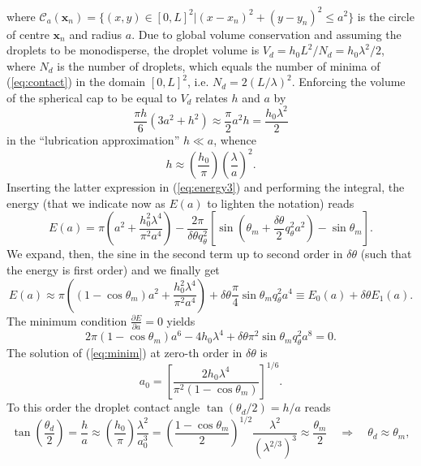 \documentclass[amsmath,amssymb,showpacs,prl,superscriptaddress,notitlepage]{revtex4-1}
\begin{document}
where
$\mathcal{C}_a(\mathbf{x}_n)=\{(x,y) \in [0, L]^2|(x-x_n)^2 + (y-y_n)^2 \leq a^2\}$
is the circle of centre $\mathbf{x}_n$ and radius $a$. 
Due to global volume conservation and assuming the droplets to be monodisperse, the droplet
volume is $V_d = h_0L^2/N_d = h_0 \lambda^2/2$,
where $N_d$ is the number of droplets, which equals the number of
minima of (\ref{eq:contact}) in the domain $[0, L]^2$, i.e. $N_d = 2(L/\lambda)^2$.
Enforcing the volume of the spherical cap to be equal to $V_d$ relates $h$ and $a$ by
\begin{equation}
\frac{\pi h}{6}(3a^2 + h^2) \approx \frac{\pi}{2} a^2 h =  \frac{h_0 \lambda^2}{2}    
\end{equation}
in the ``lubrication approximation'' $h \ll a$, whence
\begin{equation}
  h \approx \left(\frac{h_0}{\pi}\right) \left(\frac{\lambda}{a}\right)^2.
\end{equation}  
Inserting the latter expression in (\ref{eq:energy3}) and performing the integral, the
energy (that we indicate now as $E(a)$ to lighten the notation) reads
\begin{equation}\label{eq:energy4}
  E(a) = \pi \left(a^2 + \frac{h_0^2 \lambda^4}{\pi^2 a^4} \right) - \frac{2\pi}{\delta \theta q_{\theta}^2}
  \left[\sin\left(\theta_m +\frac{\delta \theta}{2}q_{\theta}^2a^2\right) - \sin \theta_m \right].
\end{equation}  
We expand, then, the sine in the second term up to second order in $\delta \theta$ (such that the
energy is first order) and we finally get
\begin{equation}\label{eq:energyfin}
  E(a) \approx  \pi \left((1-\cos \theta_m) a^2 + \frac{h_0^2 \lambda^4}{\pi^2 a^4} \right)
  + \delta \theta \frac{\pi}{4}\sin \theta_m q_{\theta}^2 a^4 \equiv E_0(a) + \delta \theta E_1(a).
\end{equation}  
The minimum condition $\frac{\partial E}{\partial a} = 0$ \cite{footnote} yields
\begin{equation}\label{eq:minim}
2\pi (1-\cos \theta_m)a^6 - 4h_0 \lambda^4 + \delta \theta \pi^2 \sin \theta_m q_{\theta}^2 a^8 =0.
\end{equation}  
The solution of (\ref{eq:minim}) at zero-th order in $\delta \theta$ is
\begin{equation}\label{eq:a0}
  a_0 = \left[\frac{2h_0\lambda^4}{\pi^2(1-\cos \theta_m)}\right]^{1/6}.
\end{equation}
To this order the droplet contact angle $\tan (\theta_d/2) = h/a$ reads
\begin{equation}
\tan \left(\frac{\theta_d}{2}\right) = \frac{h}{a} \approx
\left(\frac{h_0}{\pi}\right)\frac{\lambda^2}{a_0^3} =
\left(\frac{1-\cos \theta_m}{2}\right)^{1/2}\frac{\lambda^2}{(\lambda^{2/3})^3} \approx \frac{\theta_m}{2} \quad \Rightarrow \quad \theta_d \approx \theta_m,
\end{equation}
\end{document}
